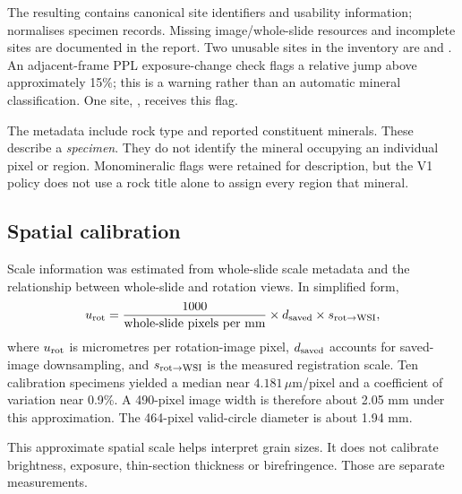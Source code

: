 The resulting  contains canonical site identifiers and usability information;  normalises specimen records. Missing image/whole-slide resources and incomplete sites are documented in the report. Two unusable sites in the inventory are  and . An adjacent-frame PPL exposure-change check flags a relative jump above approximately 15\%; this is a warning rather than an automatic mineral classification. One site, , receives this flag.

The metadata include rock type and reported constituent minerals. These describe a \emph{specimen}. They do not identify the mineral occupying an individual pixel or region. Monomineralic flags were retained for description, but the V1 policy does not use a rock title alone to assign every region that mineral.

\subsection{Spatial calibration}
Scale information was estimated from whole-slide scale metadata and the relationship between whole-slide and rotation views. In simplified form,
\begin{equation}
u_{\rm rot}=\frac{1000}{\text{whole-slide pixels per mm}}
\times d_{\rm saved}\times s_{\rm rot\to WSI},
\end{equation}
where $u_{\rm rot}$ is micrometres per rotation-image pixel, $d_{\rm saved}$ accounts for saved-image downsampling, and $s_{\rm rot\to WSI}$ is the measured registration scale. Ten calibration specimens yielded a median near $4.181\,\mu$m/pixel and a coefficient of variation near 0.9\%. A 490-pixel image width is therefore about 2.05 mm under this approximation. The 464-pixel valid-circle diameter is about 1.94 mm.

This approximate spatial scale helps interpret grain sizes. It does not calibrate brightness, exposure, thin-section thickness or birefringence. Those are separate measurements.

\FloatBarrier

